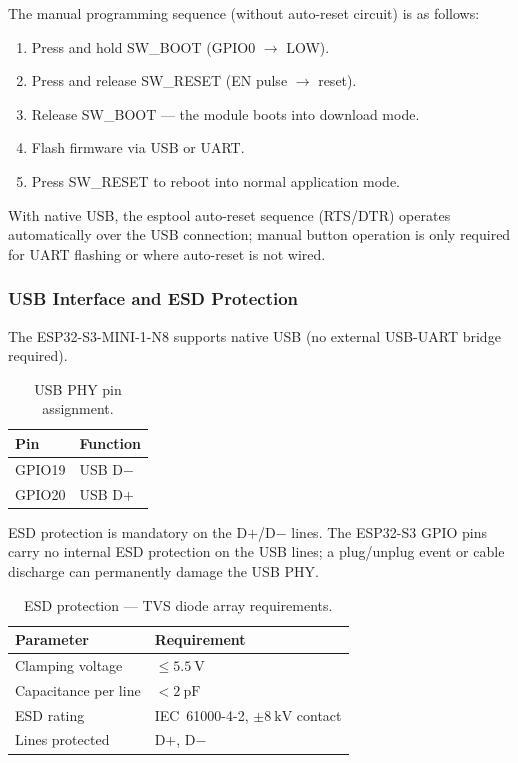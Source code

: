 The manual programming sequence (without auto-reset circuit) is as follows:

\begin{enumerate}
  \item Press and hold SW\_BOOT (GPIO0 $\rightarrow$ LOW).
  \item Press and release SW\_RESET (EN pulse $\rightarrow$ reset).
  \item Release SW\_BOOT — the module boots into download mode.
  \item Flash firmware via \ac{USB} or \ac{UART}.
  \item Press SW\_RESET to reboot into normal application mode.
\end{enumerate}

With native \ac{USB}, the esptool auto-reset sequence (RTS/DTR) operates automatically over the \ac{USB} connection; manual button operation is only required for \ac{UART} flashing or where auto-reset is not wired.

\subsubsection{\ac{USB} Interface and \ac{ESD} Protection}
\label{sec:usb_programming}

The ESP32-S3-MINI-1-N8 supports native \ac{USB} (no external \ac{USB}-\ac{UART} bridge required).

\begin{table}[H]
  \caption{\ac{USB} \ac{PHY} pin assignment.}
  \label{tab:usb_pins}
  \centering
  \begin{tabularx}{\textwidth}{|X|X|}
    \hline
    \textbf{Pin} & \textbf{Function} \\ \hline \hline
    GPIO19 & USB D$-$ \\ \hline
    GPIO20 & USB D$+$ \\ \hline
  \end{tabularx}
\end{table}

\ac{ESD} protection is mandatory on the D$+$/D$-$ lines.
The ESP32-S3 \ac{GPIO} pins carry no internal \ac{ESD} protection on the \ac{USB} lines; a plug/unplug event or cable discharge can permanently damage the \ac{USB} \ac{PHY}.

\begin{table}[H]
  \caption{\ac{ESD} protection — \ac{TVS} diode array requirements.}
  \label{tab:esd_requirements}
  \centering
  \begin{tabularx}{\textwidth}{|X|X|}
    \hline
    \textbf{Parameter} & \textbf{Requirement} \\ \hline \hline
    Clamping voltage        & $\leq \SI{5.5}{\volt}$ \\ \hline
    Capacitance per line    & $< \SI{2}{\pico\farad}$ \\ \hline
    \ac{ESD} rating         & IEC~61000-4-2, $\pm\SI{8}{\kilo\volt}$ contact \\ \hline
    Lines protected         & D$+$, D$-$ \\ \hline
  \end{tabularx}
\end{table}

